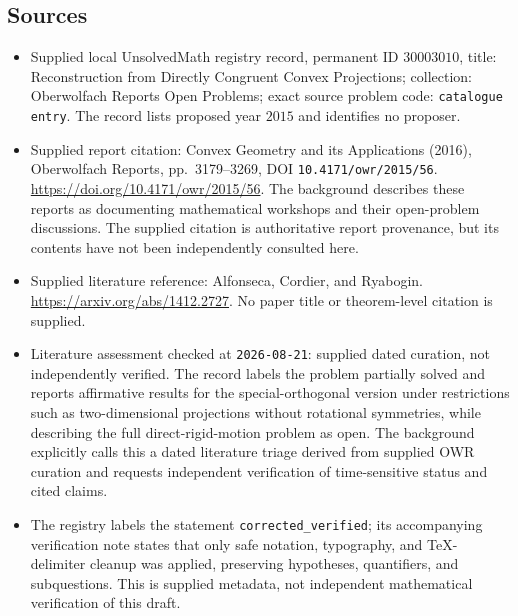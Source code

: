 \documentclass[11pt]{article}
\begin{document}
\subsection{Sources}
\begin{itemize}
\item Supplied local UnsolvedMath registry record, permanent ID \(30003010\), title: Reconstruction from Directly Congruent Convex Projections; collection: Oberwolfach Reports Open Problems; exact source problem code: \texttt{catalogue entry}. The record lists proposed year \(2015\) and identifies no proposer.
\item Supplied report citation: Convex Geometry and its Applications (2016), Oberwolfach Reports, pp.\ 3179--3269, DOI \texttt{10.4171/owr/2015/56}. \url{https://doi.org/10.4171/owr/2015/56}. The background describes these reports as documenting mathematical workshops and their open-problem discussions. The supplied citation is authoritative report provenance, but its contents have not been independently consulted here.
\item Supplied literature reference: Alfonseca, Cordier, and Ryabogin. \url{https://arxiv.org/abs/1412.2727}. No paper title or theorem-level citation is supplied.
\item Literature assessment checked at \texttt{2026-08-21}: supplied dated curation, not independently verified. The record labels the problem partially solved and reports affirmative results for the special-orthogonal version under restrictions such as two-dimensional projections without rotational symmetries, while describing the full direct-rigid-motion problem as open. The background explicitly calls this a dated literature triage derived from supplied OWR curation and requests independent verification of time-sensitive status and cited claims.
\item The registry labels the statement \texttt{corrected\_verified}; its accompanying verification note states that only safe notation, typography, and TeX-delimiter cleanup was applied, preserving hypotheses, quantifiers, and subquestions. This is supplied metadata, not independent mathematical verification of this draft.
\end{itemize}
\end{document}
